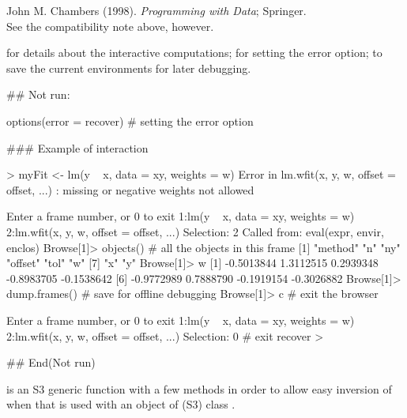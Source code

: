 %
\begin{References}\relax
John M. Chambers (1998).
\emph{Programming with Data}; Springer. \\{}
See the compatibility note above, however.
\end{References}
%
\begin{SeeAlso}\relax
{} for details about the interactive computations;
 for setting the error option;
 to save the current environments for later
debugging.
\end{SeeAlso}
%
\begin{Examples}
\begin{ExampleCode}
## Not run: 

options(error = recover) # setting the error option

### Example of interaction

> myFit <- lm(y ~ x, data = xy, weights = w)
Error in lm.wfit(x, y, w, offset = offset, ...) :
        missing or negative weights not allowed

Enter a frame number, or 0 to exit
1:lm(y ~ x, data = xy, weights = w)
2:lm.wfit(x, y, w, offset = offset, ...)
Selection: 2
Called from: eval(expr, envir, enclos)
Browse[1]> objects() # all the objects in this frame
[1] "method" "n"      "ny"     "offset" "tol"    "w"
[7] "x"      "y"
Browse[1]> w
[1] -0.5013844  1.3112515  0.2939348 -0.8983705 -0.1538642
[6] -0.9772989  0.7888790 -0.1919154 -0.3026882
Browse[1]> dump.frames() # save for offline debugging
Browse[1]> c # exit the browser

Enter a frame number, or 0 to exit
1:lm(y ~ x, data = xy, weights = w)
2:lm.wfit(x, y, w, offset = offset, ...)
Selection: 0 # exit recover
>


## End(Not run)
\end{ExampleCode}
\end{Examples}
%
\begin{Description}\relax
{} is an S3 generic function with a few methods in order
to allow easy inversion of  when that is used
with an object  of (S3) class .
\end{Description}
